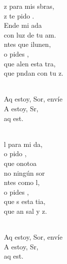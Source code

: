 \documentclass[12pt]{article}
\begin{document}
\begin{multicols*}{2}
\begin{cancion}[Envíame][Ixcís]%
	z para mis sbras,\\
	z te pido . \\
	Ende mi ada\\
	con  luz de tu am.\\
	ntes que ilunen, \\
	o pides , \\
	que alen esta tra,\\
	que pndan con tu z.\\\jump\\
	\begin{chorus}%
	Aq estoy, Sor, envíe  \\
	A estoy, Sr, \\
	aq est.  \\
	\end{chorus}%
	\jump\\
	l para mi da,\\
	o pido , \\
	que onotoa \\
	no  ningún sor\\
	ntes como l,\\
	o pides , \\
	que s esta tia,\\
	que an sal y z.\\\jump\\
	\begin{chorus}%
	Aq estoy, Sor, envíe  \\
	A estoy, Sr, \\
	aq est.  \\

\end{chorus}
\end{cancion}
\end{multicols*}
\end{document}
